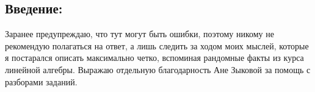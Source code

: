 \documentclass[12pt, a4paper]{article}
\begin{document}
\maketitle
\thispagestyle{empty}

\subsection*{Введение:}
Заранее предупреждаю, что тут могут быть ошибки, поэтому никому не рекомендую полагаться на ответ, а лишь следить за ходом моих мыслей, которые я постарался описать максимально четко, вспоминая рандомные факты из курса линейной алгебры. Выражаю отдельную благодарность Ане Зыковой за помощь с разборами заданий.


\newpage

\newpage

\newpage

\newpage

\newpage

\newpage

\newpage

\end{document}
